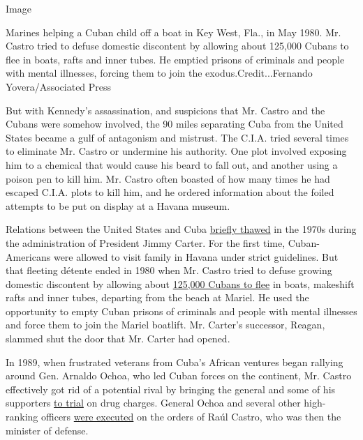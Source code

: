 Image

Marines helping a Cuban child off a boat in Key West, Fla., in May 1980.
Mr. Castro tried to defuse domestic discontent by allowing about 125,000
Cubans to flee in boats, rafts and inner tubes. He emptied prisons of
criminals and people with mental illnesses, forcing them to join the
exodus.Credit...Fernando Yovera/Associated Press

But with Kennedy's assassination, and suspicions that Mr. Castro and the
Cubans were somehow involved, the 90 miles separating Cuba from the
United States became a gulf of antagonism and mistrust. The C.I.A. tried
several times to eliminate Mr. Castro or undermine his authority. One
plot involved exposing him to a chemical that would cause his beard to
fall out, and another using a poison pen to kill him. Mr. Castro often
boasted of how many times he had escaped C.I.A. plots to kill him, and
he ordered information about the foiled attempts to be put on display at
a Havana museum.

Relations between the United States and Cuba
\href{http://query.nytimes3xbfgragh.onion/gst/abstract.html?res=9C07E1D61139E334BC4953DFB066838C669EDE}{briefly
thawed} in the 1970s during the administration of President Jimmy
Carter. For the first time, Cuban-Americans were allowed to visit family
in Havana under strict guidelines. But that fleeting détente ended in
1980 when Mr. Castro tried to defuse growing domestic discontent by
allowing about
\href{http://www.history.com/this-day-in-history/castro-announces-mariel-boatlift}{125,000
Cubans to flee} in boats, makeshift rafts and inner tubes, departing
from the beach at Mariel. He used the opportunity to empty Cuban prisons
of criminals and people with mental illnesses and force them to join the
Mariel boatlift. Mr. Carter's successor, Reagan, slammed shut the door
that Mr. Carter had opened.

In 1989, when frustrated veterans from Cuba's African ventures began
rallying around Gen. Arnaldo Ochoa, who led Cuban forces on the
continent, Mr. Castro effectively got rid of a potential rival by
bringing the general and some of his supporters
\href{http://www.nytimes3xbfgragh.onion/1989/06/27/world/raul-castro-adds-sparks-to-cuban-trial.html}{to
trial} on drug charges. General Ochoa and several other high-ranking
officers
\href{http://www.nytimes3xbfgragh.onion/1989/07/14/world/cuban-general-and-three-others-executed-for-sending-drugs-to-us.html}{were
executed} on the orders of Raúl Castro, who was then the minister of
defense.

